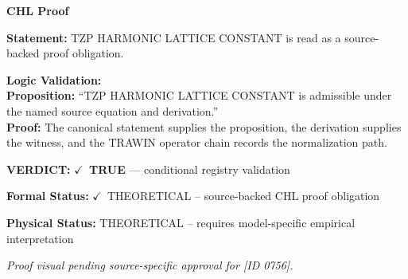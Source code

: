 \vspace{0.45em}
\noindent\textbf{CHL Proof}\par
\textbf{Statement:} TZP HARMONIC LATTICE CONSTANT is read as a source-backed proof obligation.

\textbf{Logic Validation:}\\
\textbf{Proposition:} ``TZP HARMONIC LATTICE CONSTANT is admissible under the named source equation and derivation.''\\
\textbf{Proof:} The canonical statement supplies the proposition, the derivation supplies the witness, and the TRAWIN operator chain records the normalization path.

\textbf{VERDICT:} \ensuremath{\checkmark}\ \textbf{TRUE} --- conditional registry validation

\textbf{Formal Status:} \ensuremath{\checkmark}\ THEORETICAL -- source-backed CHL proof obligation

\textbf{Physical Status:} THEORETICAL -- requires model-specific empirical interpretation
\par\vspace{0.45em}
\par
\vfill
\begingroup\footnotesize\itshape
Proof visual pending source-specific approval for [ID 0756].
\par\endgroup
\vfill
\endgroup
\endgroup
